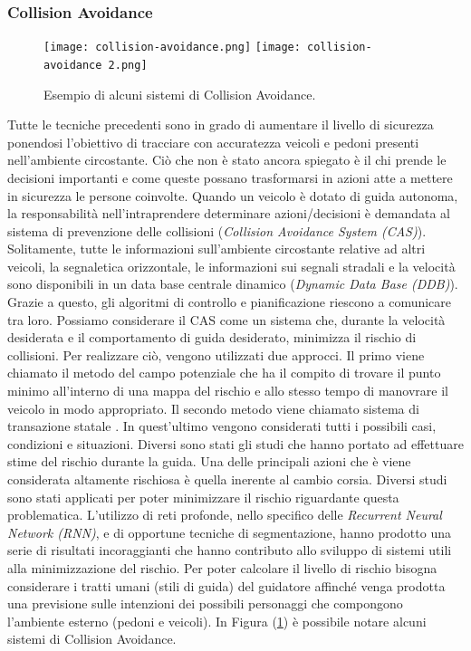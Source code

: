 \subsubsection{Collision Avoidance}
\begin{figure}
    \centering
    \texttt{[image: collision-avoidance.png]}
    \texttt{[image: collision-avoidance 2.png]}
    \centering
    \caption{Esempio di alcuni sistemi di Collision Avoidance.}
    \label{coll-avoid}
\end{figure}
Tutte le tecniche precedenti sono in grado di aumentare il livello di sicurezza 
ponendosi l'obiettivo di tracciare con accuratezza veicoli e pedoni presenti 
nell'ambiente circostante. Ciò che non è stato ancora spiegato è il chi prende 
le decisioni importanti e come queste possano trasformarsi in azioni atte a 
mettere in sicurezza le persone coinvolte. Quando un veicolo è dotato di 
guida autonoma, la responsabilità nell'intraprendere determinare azioni/decisioni 
è demandata al sistema di prevenzione delle collisioni (\emph{Collision 
Avoidance System (CAS)}). Solitamente, tutte le informazioni sull'ambiente 
circostante relative ad altri veicoli, la segnaletica orizzontale, le informazioni 
sui segnali stradali e la velocità sono disponibili in un data base centrale 
dinamico (\emph{Dynamic Data Base (DDB)}). Grazie a questo, gli algoritmi di 
controllo e pianificazione riescono a comunicare tra loro. Possiamo considerare 
il CAS come un sistema che, durante la velocità desiderata e il 
comportamento di guida desiderato, minimizza il rischio di collisioni. Per 
realizzare ciò, vengono utilizzati due approcci. Il primo viene chiamato 
il metodo del campo potenziale \cite{col-avoid} che ha il compito di trovare il punto 
minimo all'interno di una mappa del rischio e allo stesso tempo di manovrare 
il veicolo in modo appropriato. Il secondo metodo viene chiamato sistema di 
transazione statale \cite{col-avoid2}. In quest'ultimo vengono considerati tutti i possibili 
casi, condizioni e situazioni. Diversi sono stati gli studi che hanno portato 
ad effettuare stime del rischio durante la guida. Una delle principali azioni 
che è viene considerata altamente rischiosa è quella inerente al cambio corsia. 
Diversi studi \cite{risk} sono stati applicati per poter minimizzare il rischio riguardante 
questa problematica. L'utilizzo di reti profonde, nello specifico delle 
\emph{Recurrent Neural Network (RNN)}, e di opportune tecniche di segmentazione, 
hanno prodotto una serie di risultati incoraggianti che hanno contributo 
allo sviluppo di sistemi utili alla minimizzazione del rischio.  Per poter 
calcolare il livello di rischio bisogna considerare i tratti umani (stili di guida) 
del guidatore affinché venga prodotta una previsione sulle intenzioni dei 
possibili personaggi che compongono l'ambiente esterno (pedoni e veicoli). 
In Figura (\ref{coll-avoid}) è possibile notare alcuni sistemi di Collision Avoidance.

